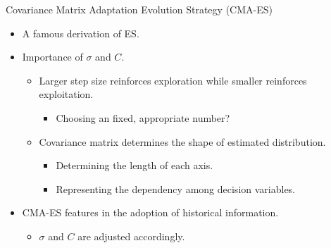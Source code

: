 \begin{frame}{Covariance Matrix Adaptation Evolution Strategy (CMA-ES)}
  \begin{itemize}
    \item A famous derivation of ES.
      \vspace*{14pt}
    \item Importance of $\sigma$ and $C$.
      \begin{itemize}
        \item Larger step size reinforces exploration while smaller
          reinforces exploitation.
          \begin{itemize}
            \item Choosing an fixed, appropriate number?
          \end{itemize}
        \item Covariance matrix determines the shape of estimated
          distribution.
          \begin{itemize}
            \item Determining the length of each axis.
            \item Representing the dependency among decision variables.
          \end{itemize}
      \end{itemize}
      \vspace*{14pt}
    \item CMA-ES features in the adoption of historical information.
      \begin{itemize}
        \item $\sigma$ and $C$ are adjusted accordingly.
      \end{itemize}
  \end{itemize}
\end{frame}

